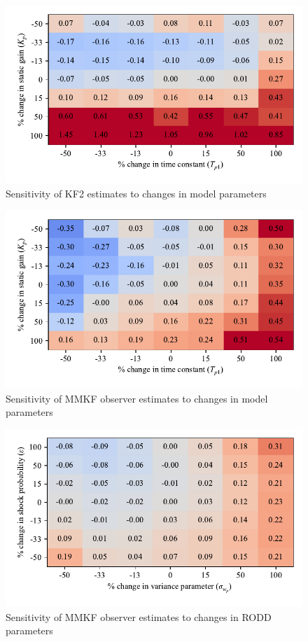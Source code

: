 \begin{figure}[htp]
	\centering
	\includegraphics[width=12.5cm]{images/rod_obs_sim_sens_model_KF2_MSE_y_est.pdf}
	\caption{Sensitivity of KF2 estimates to changes in model parameters}
	\label{fig:rod_obs_sim_sens_model_KF2_MSE_y_est}
\end{figure}

\begin{figure}[htp]
	\centering
	\includegraphics[width=12.5cm]{images/rod_obs_sim_sens_model_MMKF_MSE_y_est.pdf}
	\caption{Sensitivity of MMKF observer estimates to changes in model parameters}
	\label{fig:rod_obs_sim_sens_model_MMKF_MSE_y_est}
\end{figure}

\begin{figure}[htp]
	\centering
	\includegraphics[width=12.5cm]{images/rod_obs_sim_sens_rod_MMKF_MSE_y_est.pdf}
	\caption{Sensitivity of MMKF observer estimates to changes in RODD parameters}
	\label{fig:rod_obs_sim_sens_rod_MMKF_MSE_y_est}
\end{figure}


